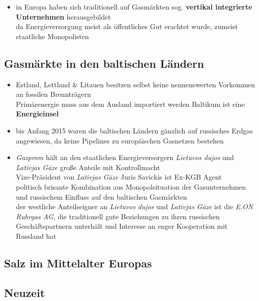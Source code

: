\documentclass[11pt,a4paper]{article}
\begin{document}
\begin{itemize}
\item in Europa haben sich traditionell auf Gasmärkten sog. \textbf{vertikal integrierte Unternehmen} herausgebildet\\
 da Energieversorgung meist als öffentliches Gut erachtet wurde, zumeist staatliche Monopolisten


\end{itemize}




\subsection*{\textsf{Gasmärkte in den baltischen Ländern}}

\begin{itemize}

\item Estland, Lettland \& Litauen besitzen selbst keine nennenswerten Vorkommen an fossilen Brennträgern\\
 Primärenergie muss aus dem Ausland importiert werden
 Baltikum ist eine \textbf{Energieinsel}

\item bis Anfang 2015 waren die baltischen Ländern gänzlich auf russisches Erdgas angewiesen, da keine Pipelines zu europäischen Gasnetzen bestehen

\item \textsl{Gazprom} hält an den staatlichen Energieversorgern \emph{Lietuvos dujos} und \emph{Lativjas G\={a}ze} große Anteile mit Kontrollmacht\\
 Vize-Präsident von \emph{Lativjas G\={a}ze} Juris Savickis ist Ex-KGB Agent\\
 politisch brisante Kombination aus Monopolsituation der Gasunternehmen und russischem Einfluss auf den baltischen Gasmärkten\\
 der westliche Anteilseigner an \emph{Lietuvos dujos} und \emph{Lativjas G\={a}ze} ist die \textsl{E.ON Ruhrgas AG}, die traditionell gute Beziehungen zu ihren russischen Geschäftspartnern unterhält und Interesse an enger Kooperation mit Russland hat

\end{itemize}



\subsection*{\textsf{Salz im Mittelalter Europas}}



\subsection*{\textsf{Neuzeit}}
\end{document}
